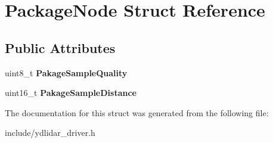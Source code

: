 \hypertarget{struct_package_node}{}\section{Package\+Node Struct Reference}
\label{struct_package_node}
\subsection*{Public Attributes}
\begin{DoxyCompactItemize}
\item 
uint8\+\_\+t {\bfseries Pakage\+Sample\+Quality}\hypertarget{struct_package_node_aa93fa6630d9886ae0e381e06a72884cf}{}\label{struct_package_node_aa93fa6630d9886ae0e381e06a72884cf}

\item 
uint16\+\_\+t {\bfseries Pakage\+Sample\+Distance}\hypertarget{struct_package_node_a1ce84783c40c6f026a1b2dad2347d7a7}{}\label{struct_package_node_a1ce84783c40c6f026a1b2dad2347d7a7}

\end{DoxyCompactItemize}


The documentation for this struct was generated from the following file\+:\begin{DoxyCompactItemize}
\item 
include/ydlidar\+\_\+driver.\+h\end{DoxyCompactItemize}
